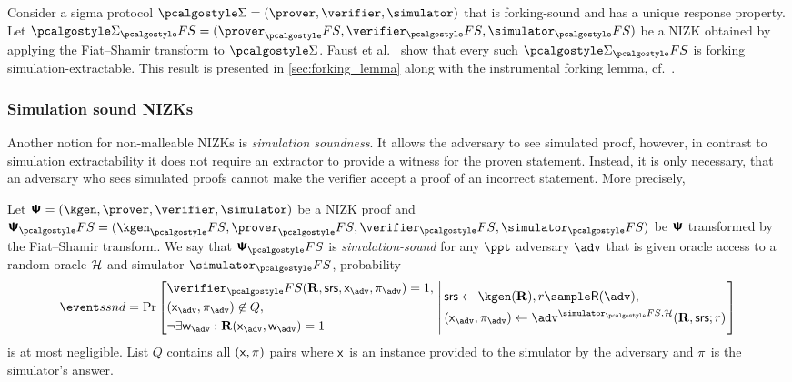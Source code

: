 \documentclass[runningheads,10pt]{llncs}
\begin{document}
Consider a sigma protocol $\sigmaprot = (\prover, \verifier, \simulator)$ that
is forking-sound and has a unique response property. Let $\sigmaprot_\fs =
(\prover_\fs, \verifier_\fs, \simulator_\fs)$ be a NIZK obtained by applying the
Fiat--Shamir transform to $\sigmaprot$. Faust et al.~\cite{INDOCRYPT:FKMV12}
show that every such $\sigmaprot_\fs$ is forking simulation-extractable. This result is
presented in \cref{sec:forking_lemma} along with the instrumental forking lemma,
cf.~\cite{CCS:BelNev06}.

\subsubsection{Simulation sound NIZKs}
Another notion for non-malleable NIZKs is \emph{simulation soundness}. It allows the adversary to see simulated proof, however, in contrast to simulation
extractability it does not require an extractor to provide a witness for the
proven statement. Instead, it is only necessary, that an adversary who sees
simulated proofs cannot make the verifier accept a proof of an incorrect
statement. More precisely,

\begin{definition}
  	\label{def:simsnd}
    Let $\ps = (\kgen, \prover, \verifier, \simulator)$ be a NIZK proof and
    $\ps_\fs = (\kgen_\fs, \prover_\fs, \verifier_\fs, \simulator_\fs)$ be $\bm{\mathsf{\Psi}}$
    transformed by the Fiat--Shamir transform. We say that $\ps_\fs$ is
    \emph{simulation-sound}
    for any $\ppt$ adversary $\adv$ that is given oracle access to a random
    oracle $\mathcal{H}$ and simulator $\simulator_\fs$, probability
    \[
      \ssndProb =
      \Pr\left[
        \begin{aligned}
          & \verifier_\fs(\REL, \srs, \inp_{\adv}, \zkproof_{\adv}) = 1,\\
          & (\inp_{\advse}, \zkproof_{\advse}) \not\in Q,\\
          & \neg \exists \wit_{\adv}: \REL(\inp_{\adv}, \wit_{\adv}) = 1
        \end{aligned}
        \, \left| \,
          \vphantom{\begin{aligned}
          & \verifier_\fs(\REL, \srs, \inp_{\adv}, \zkproof_{\adv}) = 1,\\
          & (\inp_{\advse}, \zkproof_{\advse}) \not\in Q,\\
          & \neg \exists \wit_{\adv}: \REL(\inp_{\adv}, \wit_{\adv}) = 1
        \end{aligned}}
      \begin{aligned}
        & \srs \gets \kgen(\REL), r \sample \RND{\advse},\\
        & (\inp_{\advse}, \zkproof_{\advse}) \gets \advse^{\simulator_\fs,
          \ro} (\REL, \srs; r)
      \end{aligned}
		\right.  \right]
    \]
    is at most negligible.  List $Q$ contains all $(\mathsf{x}, \pi)$ pairs where
  $\mathsf{x}$ is an instance provided to the simulator by the adversary and
  $\pi$ is the simulator's answer. 
\end{definition}
\end{document}
